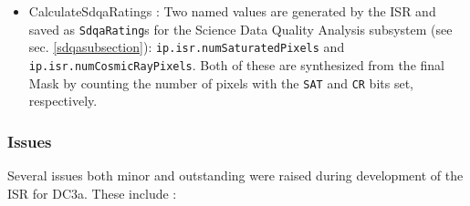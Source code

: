 \begin{itemize}
\item CalculateSdqaRatings : Two named values are generated by the ISR
and saved as {\tt SdqaRating}s for the Science Data Quality Analysis
subsystem (see sec. \ref{sdqasubsection}):  
{\tt ip.isr.numSaturatedPixels} and {\tt ip.isr.numCosmicRayPixels}.
Both of these are synthesized from the final Mask by counting the
number of pixels with the {\tt SAT} and {\tt CR} bits set,
respectively.

\end{itemize}

\iffalse
%
%
\subsubsection{Results}

The only truly testable portion of the ISR during DC3a was the
identification and masking of the cosmic rays synthesized for the
second (i.e. exposure idenifier 1) images.  

\fi

\subsubsection{Issues}

Several issues both minor and outstanding were raised during
development of the ISR for DC3a.  These include :

